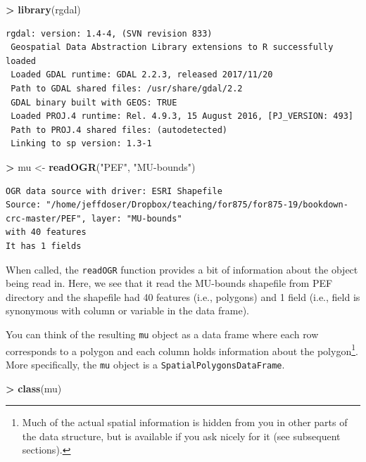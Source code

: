 \documentclass[]{krantz}
\makeatletter
\newenvironment{Shaded}{\begin{snugshade}}{\end{snugshade}}
\newcommand{\KeywordTok}[1]{\textcolor[rgb]{0.27,0.27,0.27}{\textbf{#1}}}
\newcommand{\StringTok}[1]{\textcolor[rgb]{0.5,0.5,0.5}{#1}}
\newcommand{\OperatorTok}[1]{\textcolor[rgb]{0.43,0.43,0.43}{\textbf{#1}}}
\newcommand{\NormalTok}[1]{#1}
\newenvironment{kframe}{%
\medskip{}
\setlength{\fboxsep}{.8em}
 \def\at@end@of@kframe{}%
 \ifinner\ifhmode%
  \def\at@end@of@kframe{\end{minipage}}%
  \begin{minipage}{\columnwidth}%
 \fi\fi%
 \def\FrameCommand##1{\hskip\@totalleftmargin \hskip-\fboxsep
 \colorbox{shadecolor}{##1}\hskip-\fboxsep
     \hskip-\linewidth \hskip-\@totalleftmargin \hskip\columnwidth}%
 \MakeFramed {\advance\hsize-\width
   \@totalleftmargin\z@ \linewidth\hsize
   \@setminipage}}%
 {\par\unskip\endMakeFramed%
 \at@end@of@kframe}
\renewenvironment{Shaded}{\begin{kframe}}{\end{kframe}}
\makeatother
\begin{document}
\begin{Shaded}
\begin{Highlighting}[]
\OperatorTok{>}\StringTok{ }\KeywordTok{library}\NormalTok{(rgdal)}
\end{Highlighting}
\end{Shaded}

\begin{verbatim}
rgdal: version: 1.4-4, (SVN revision 833)
 Geospatial Data Abstraction Library extensions to R successfully loaded
 Loaded GDAL runtime: GDAL 2.2.3, released 2017/11/20
 Path to GDAL shared files: /usr/share/gdal/2.2
 GDAL binary built with GEOS: TRUE 
 Loaded PROJ.4 runtime: Rel. 4.9.3, 15 August 2016, [PJ_VERSION: 493]
 Path to PROJ.4 shared files: (autodetected)
 Linking to sp version: 1.3-1 
\end{verbatim}

\begin{Shaded}
\begin{Highlighting}[]
\OperatorTok{>}\StringTok{ }\NormalTok{mu <-}\StringTok{ }\KeywordTok{readOGR}\NormalTok{(}\StringTok{"PEF"}\NormalTok{, }\StringTok{"MU-bounds"}\NormalTok{)}
\end{Highlighting}
\end{Shaded}

\begin{verbatim}
OGR data source with driver: ESRI Shapefile 
Source: "/home/jeffdoser/Dropbox/teaching/for875/for875-19/bookdown-crc-master/PEF", layer: "MU-bounds"
with 40 features
It has 1 fields
\end{verbatim}

When called, the \texttt{readOGR} function provides a bit of information
about the object being read in. Here, we see that it read the MU-bounds
shapefile from PEF directory and the shapefile had 40 features (i.e.,
polygons) and 1 field (i.e., field is synonymous with column or variable
in the data frame).

You can think of the resulting \texttt{mu} object as a data frame where
each row corresponds to a polygon and each column holds information
about the polygon\footnote{Much of the actual spatial information is
  hidden from you in other parts of the data structure, but is available
  if you ask nicely for it (see subsequent sections).}. More
specifically, the \texttt{mu} object is a
\texttt{SpatialPolygonsDataFrame}.

\begin{Shaded}
\begin{Highlighting}[]
\OperatorTok{>}\StringTok{ }\KeywordTok{class}\NormalTok{(mu)}
\end{Highlighting}
\end{Shaded}
\end{document}
